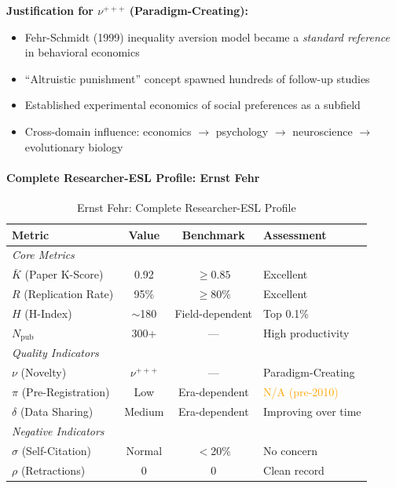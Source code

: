 \documentclass[11pt,a4paper]{article}
\begin{document}
\textbf{Justification for $\nu^{+++}$ (Paradigm-Creating):}
\begin{itemize}
    \item Fehr-Schmidt (1999) inequality aversion model became a \textit{standard reference} in behavioral economics
    \item ``Altruistic punishment'' concept spawned hundreds of follow-up studies
    \item Established experimental economics of social preferences as a subfield
    \item Cross-domain influence: economics $\to$ psychology $\to$ neuroscience $\to$ evolutionary biology
\end{itemize}

\paragraph{Complete Researcher-ESL Profile: Ernst Fehr}

\begin{table}[h]
\centering
\caption{Ernst Fehr: Complete Researcher-ESL Profile}
\begin{tabular}{lccl}
\toprule
\textbf{Metric} & \textbf{Value} & \textbf{Benchmark} & \textbf{Assessment} \\
\midrule
\multicolumn{4}{l}{\textit{Core Metrics}} \\
$\bar{K}$ (Paper K-Score) & 0.92 & $\geq 0.85$ & \textcolor{green!60!black}{Excellent} \\
$R$ (Replication Rate) & 95\% & $\geq 80\%$ & \textcolor{green!60!black}{Excellent} \\
$H$ (H-Index) & $\sim$180 & Field-dependent & \textcolor{green!60!black}{Top 0.1\%} \\
$N_{\text{pub}}$ & 300+ & --- & High productivity \\
\midrule
\multicolumn{4}{l}{\textit{Quality Indicators}} \\
$\nu$ (Novelty) & $\nu^{+++}$ & --- & \textcolor{green!60!black}{Paradigm-Creating} \\
$\pi$ (Pre-Registration) & Low & Era-dependent & \textcolor{orange}{N/A (pre-2010)} \\
$\delta$ (Data Sharing) & Medium & Era-dependent & Improving over time \\
\midrule
\multicolumn{4}{l}{\textit{Negative Indicators}} \\
$\sigma$ (Self-Citation) & Normal & $<$20\% & \textcolor{green!60!black}{No concern} \\
$\rho$ (Retractions) & 0 & 0 & \textcolor{green!60!black}{Clean record} \\
\bottomrule
\end{tabular}
\end{table}
\end{document}
